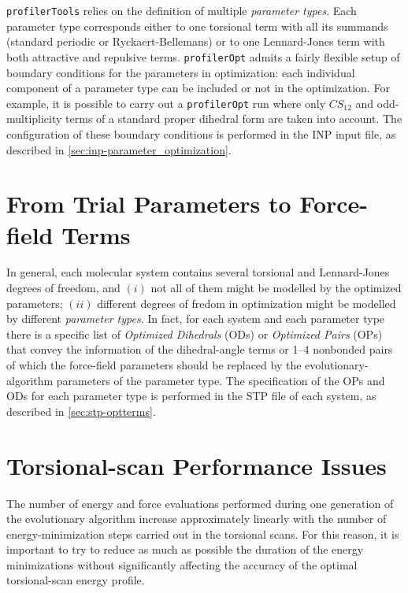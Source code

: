 \documentclass[10pt,a4paper,openany]{memoir}
\numberwithin{equation}{section}
\newcommand{\profileropt}[0]{\texttt{profilerOpt}}
\newcommand{\profilertools}[0]{\texttt{profilerTools}}
\begin{document}
\profilertools{} relies on the definition of multiple
\textit{parameter types}.
%
Each parameter type corresponds either to one torsional term with all
its summands (standard periodic or Ryckaert-Bellemans) or to one
Lennard-Jones term with both attractive and repulsive terms.
%
\profileropt{} admits a fairly flexible setup of boundary conditions
for the parameters in optimization:
%
each individual component of a parameter type can be included or not
in the optimization.
%
For example, it is possible to carry out a \profileropt{} run
where only $CS_{12}$ and odd-multiplicity terms of a standard proper
dihedral form are taken into account. The configuration of these
boundary conditions is performed in the INP input file, as described
in \autoref{sec:inp-parameter_optimization}.

\section{From Trial Parameters to Force-field Terms}
\label{sec:ga-opt-control}

In general, each molecular system contains several torsional and
Lennard-Jones degrees of freedom, and $(i)$ not all of them might be
modelled by the optimized parameters; $(ii)$ different
degrees of fredom in optimization might be modelled by different
\textit{parameter types}.
%
In fact, for each system and each parameter type there is a specific
list of \textit{Optimized Dihedrals} (ODs) or \textit{Optimized Pairs}
(OPs) that convey the information of the dihedral-angle terms or 1--4
nonbonded pairs of which the force-field parameters should be replaced
by the evolutionary-algorithm parameters of the parameter type. The
specification of the OPs and ODs for each parameter type is performed
in the STP file of each system, as described in
\autoref{sec:stp-optterms}.

\section{Torsional-scan Performance Issues}
\label{sec:torsional-scan-performance-issues}

The number of energy and force evaluations performed during one
generation of the evolutionary algorithm increase approximately
linearly with the number of energy-minimization steps carried out in
the torsional scans.  For this reason, it is important to try to
reduce as much as possible the duration of the energy minimizations
without significantly affecting the accuracy of the optimal
torsional-scan energy profile.
\end{document}
